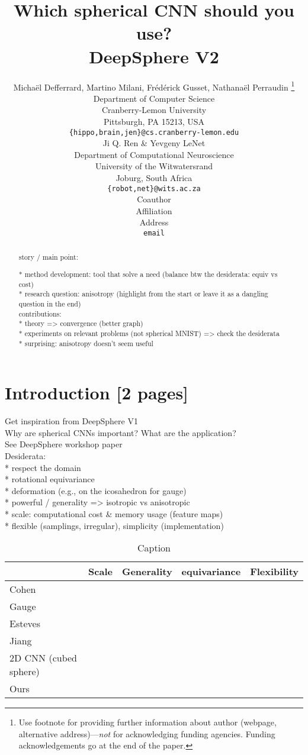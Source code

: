 \documentclass{article} %
\title{Which spherical CNN should you use?\\ DeepSphere V2}
\author{Michaël Defferrard, Martino Milani, Frédérick Gusset,  Nathanaël Perraudin \thanks{ Use footnote for providing further information about author (webpage, alternative address)---\emph{not} for acknowledging
funding agencies.  Funding acknowledgements go at the end of the paper.} \\
Department of Computer Science\\
Cranberry-Lemon University\\
Pittsburgh, PA 15213, USA \\
\texttt{\{hippo,brain,jen\}@cs.cranberry-lemon.edu} \\
\And
Ji Q. Ren \& Yevgeny LeNet \\
Department of Computational Neuroscience \\
University of the Witwatersrand \\
Joburg, South Africa \\
\texttt{\{robot,net\}@wits.ac.za} \\
\AND
Coauthor \\
Affiliation \\
Address \\
\texttt{email}
}
\begin{document}
\maketitle

\begin{abstract}
story / main point:

* method development: tool that solve a need (balance btw the desiderata: equiv vs cost)\\
* research question: anisotropy (highlight from the start or leave it as a dangling question in the end)\\

contributions:\\
* theory => convergence (better graph)\\
* experiments on relevant problems (not spherical MNIST) => check the desiderata\\
  * surprising: anisotropy doesn't seem useful\\

\end{abstract}

\section{Introduction [2 pages]}
Get inspiration from DeepSphere V1\\

Why are spherical CNNs important? What are the application?\\
See DeepSphere workshop paper\\

Desiderata:\\
* respect the domain\\
  * rotational equivariance\\
  * deformation (e.g., on the icosahedron for gauge)\\
* powerful / generality => isotropic vs anisotropic\\
* scale: computational cost \& memory usage (feature maps)\\
* flexible (samplings, irregular), simplicity (implementation)\\

\begin{table}[h!]
    \centering
    \begin{tabular}{l|c|c|c|c}
         & Scale & Generality& equivariance & Flexibility \\
         \hline
        Cohen & & & &  \\
         \hline
        Gauge & & & &  \\
         \hline
        Esteves & & & &  \\
         \hline
        Jiang & & & &  \\
         \hline
        2D CNN (cubed sphere) & & & &  \\
         \hline
        Ours & & & &  \\
    \end{tabular}
    \caption{Caption}
    \label{tab:my_label}
\end{table}
\end{document}
